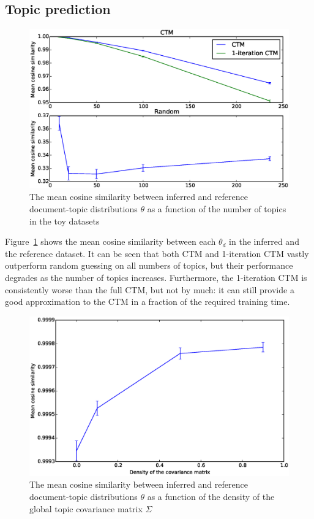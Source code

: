 \documentclass[12pt,a4paper,twoside,openright]{report}
\begin{document}
\subsection{Topic prediction}

\begin{figure}[!htb]
\includegraphics[width=\textwidth]{sim-cosine.eps}
\caption{The mean cosine similarity between inferred and reference document-topic distributions $\theta$ as a function of the number of topics in the toy datasets}
\label{fig:sim-cosine}
\end{figure}

Figure~\ref{fig:sim-cosine} shows the mean cosine similarity between each $\theta_d$ in the inferred and the reference dataset. It can be seen that both CTM and 1-iteration CTM vastly outperform random guessing on all numbers of topics, but their performance degrades as the number of topics increases. Furthermore, the 1-iteration CTM is consistently worse than the full CTM, but not by much: it can still provide a good approximation to the CTM in a fraction of the required training time.

\begin{figure}[!htb]
\includegraphics[width=\textwidth]{sim-sigmadensity-cosine.eps}
\caption{The mean cosine similarity between inferred and reference document-topic distributions $\theta$ as a function of the density of the global topic covariance matrix $\Sigma$}
\label{fig:sim-sigmadensity-cosine}
\end{figure}
\end{document}
